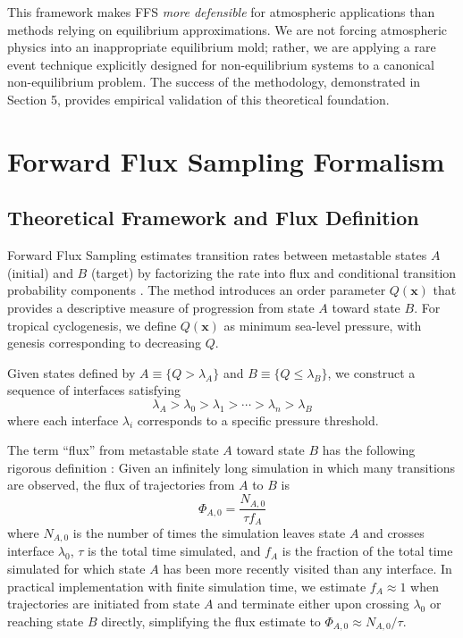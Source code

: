 \documentclass[11pt]{article}
\begin{document}
This framework makes FFS \textit{more defensible} for atmospheric applications than methods relying on equilibrium approximations. We are not forcing atmospheric physics into an inappropriate equilibrium mold; rather, we are applying a rare event technique explicitly designed for non-equilibrium systems to a canonical non-equilibrium problem. The success of the methodology, demonstrated in Section 5, provides empirical validation of this theoretical foundation.
\section{Forward Flux Sampling Formalism}

\subsection{Theoretical Framework and Flux Definition}

Forward Flux Sampling estimates transition rates between metastable states $A$ (initial) and $B$ (target) by factorizing the rate into flux and conditional transition probability components \citep{allen2006forward,allen2009forward}. The method introduces an order parameter $Q(\mathbf{x})$ that provides a descriptive measure of progression from state $A$ toward state $B$. For tropical cyclogenesis, we define $Q(\mathbf{x})$ as minimum sea-level pressure, with genesis corresponding to decreasing $Q$.

Given states defined by $A \equiv \{Q > \lambda_A\}$ and $B \equiv \{Q \leq \lambda_B\}$, we construct a sequence of interfaces satisfying
\begin{equation}
\lambda_A > \lambda_0 > \lambda_1 > \cdots > \lambda_n > \lambda_B
\end{equation}
where each interface $\lambda_i$ corresponds to a specific pressure threshold.

The term ``flux'' from metastable state $A$ toward state $B$ has the following rigorous definition \citep{allen2009forward}: Given an infinitely long simulation in which many transitions are observed, the flux of trajectories from $A$ to $B$ is
\begin{equation}
\Phi_{A,0} = \frac{N_{A,0}}{\tau f_A}
\label{eq:flux_definition}
\end{equation}
where $N_{A,0}$ is the number of times the simulation leaves state $A$ and crosses interface $\lambda_0$, $\tau$ is the total time simulated, and $f_A$ is the fraction of the total time simulated for which state $A$ has been more recently visited than any interface. In practical implementation with finite simulation time, we estimate $f_A \approx 1$ when trajectories are initiated from state $A$ and terminate either upon crossing $\lambda_0$ or reaching state $B$ directly, simplifying the flux estimate to $\Phi_{A,0} \approx N_{A,0}/\tau$.
\end{document}
